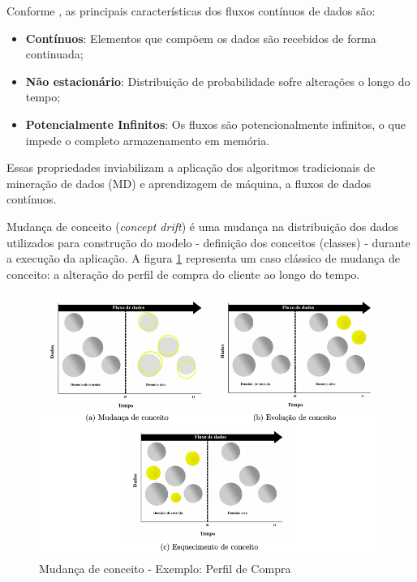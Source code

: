 \documentclass[qual, classic, a4paper]{ufbathesis}
\begin{document}
Conforme \cite{Gama:2014:survey}, as principais características dos fluxos contínuos de dados são:

\begin{itemize}
    \item \textbf{Contínuos}: Elementos que compõem os dados são recebidos de forma continuada;

    \item \textbf{Não estacionário}: Distribuição de probabilidade sofre alterações o longo do tempo;

    \item \textbf{Potencialmente Infinitos}: Os fluxos são potencionalmente infinitos, o que impede o completo armazenamento em memória.
\end{itemize}

Essas propriedades inviabilizam a aplicação dos algoritmos tradicionais de mineração de dados (MD) e aprendizagem de máquina, a fluxos de dados contínuos.

Mudança de conceito (\textit{concept drift}) é uma mudança na distribuição dos dados utilizados para construção do modelo - definição dos conceitos (classes) - durante a execução da aplicação. A figura \ref{fig1} representa um caso clássico de mudança de conceito: a alteração do perfil de compra do cliente ao longo do tempo.

\begin{figure}[htbp]
    \begin{center}
      \includegraphics[scale=0.4]{001.png}
    \caption{Mudança de conceito - Exemplo: Perfil de Compra}
    \label{fig1}
    \end{center}
\end{figure}
\end{document}
